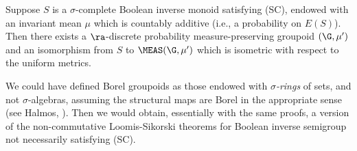 \begin{corollary}\label{theoremtracialncloomissikorski}
Suppose $S$ is a $\sigma$-complete Boolean inverse monoid satisfying (SC), endowed with an invariant mean $\mu$ which is countably additive (i.e., a probability on $E(S)$). Then there exists a $\ra$-discrete probability measure-preserving groupoid $(\G,\mu')$ and an isomorphism from $S$ to $\MEAS(\G,\mu')$ which is isometric with respect to the uniform metrics.
\end{corollary}

\begin{remark}
We could have defined Borel groupoids as those endowed with \emph{$\sigma$-rings} of sets, and not $\sigma$-algebras, assuming the structural maps are Borel in the appropriate sense (see Halmos, \cite{MR0033869}). Then we would obtain, essentially with the same proofs, a version of the non-commutative Loomis-Sikorski theorems for Boolean inverse semigroup not necessarily satisfying (SC).
\end{remark}
%
%

